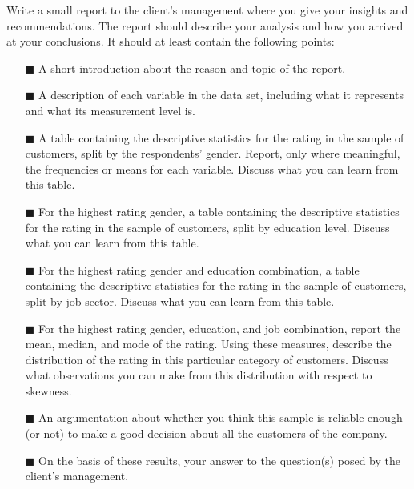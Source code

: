 Write a small report to the client's management where you give your insights and recommendations. The report should describe your analysis and how you arrived at your conclusions. It should at least contain the following points: \\

\begin{itemize}
    \item[$\blacksquare$] A short introduction about the reason and topic of the report.
    \item[$\blacksquare$] A description of each variable in the  data set, including what it represents and what its measurement level is. 
    \item[$\blacksquare$] A table containing the descriptive statistics for the rating in the sample of customers, split by the respondents' gender. Report, only where meaningful, the frequencies or means for each variable. Discuss what you can learn from this table. 
    \item[$\blacksquare$] For the highest rating gender, a table containing the descriptive statistics for the rating in the sample of customers, split by education level. Discuss what you can learn from this table. 
    \item[$\blacksquare$] For the highest rating gender and education combination, a table containing the descriptive statistics for the rating in the sample of customers, split by job sector. Discuss what you can learn from this table. 
    \item[$\blacksquare$] For the highest rating gender, education, and job combination, report the mean, median, and mode of the rating. Using these measures, describe the distribution of the rating in this particular category of customers. Discuss what observations you can make from this distribution with respect to skewness. 
    \item[$\blacksquare$] An argumentation about whether you think this sample is reliable enough (or not) to make a good decision about all the customers of the company.
    \item[$\blacksquare$] On the basis of these results, your answer to the question(s) posed by the client's management.
\end{itemize}

\clearpage %
